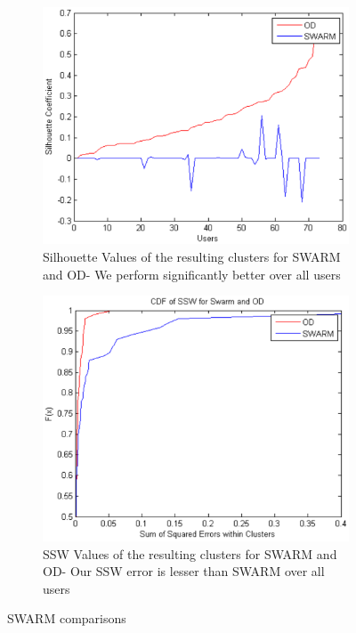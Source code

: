 \begin{figure}
    \centering
    \begin{subfigure}[t]{.5\textwidth}
        \centering
        \includegraphics[scale=0.6]{figs/swarm_od_silcomparison.eps}
\caption{Silhouette Values of the resulting clusters for SWARM and OD- We perform significantly better over all users}
\label{fig:SWARM_OD}  
    \end{subfigure}%
	\begin{subfigure}[t]{.5\textwidth}
        \centering
        \includegraphics[scale=0.6]{figs/swarm_od_ssw.eps}
\caption{SSW Values of the resulting clusters for SWARM and OD- Our SSW error is lesser than SWARM over all users}
\label{fig:SSW_SWARM} 
    \end{subfigure}
    \caption{SWARM comparisons}
    \label{fig:swarm}       
\end{figure}


